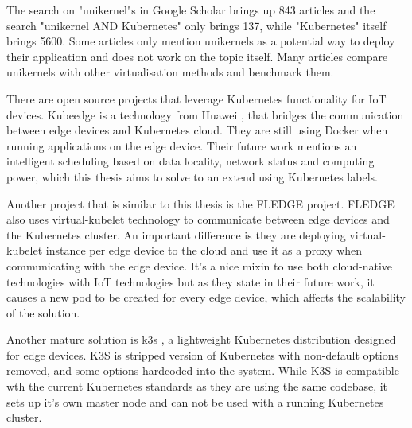  The search on "unikernel"s in Google Scholar brings up 843 articles and the search "unikernel AND Kubernetes" only brings 137, while "Kubernetes" itself brings 5600. Some articles only mention unikernels as a potential way to deploy their application and does not work on the topic itself. Many articles compare unikernels with other virtualisation methods and benchmark them.

There are open source projects that leverage Kubernetes functionality for IoT devices. Kubeedge \cite{kubeedge} is a technology from Huawei , that bridges the communication between edge devices and Kubernetes cloud. They are still using Docker when running applications on the edge device. Their future work mentions an intelligent scheduling based on data locality, network status and computing power, which this thesis aims to solve to an extend using Kubernetes labels.

Another project that is similar to this thesis is the FLEDGE project\cite{fledge}. FLEDGE also uses virtual-kubelet technology to communicate between edge devices and the Kubernetes cluster. An important difference is they are deploying virtual-kubelet instance per edge device to the cloud and use it as a proxy when communicating with the edge device. It's a nice mixin to use both cloud-native technologies with IoT technologies but as they state in their future work, it causes a new pod to be created for every edge device, which affects the scalability of the solution.

Another mature solution is k3s \cite{k3s}, a lightweight Kubernetes distribution designed for edge devices. K3S is stripped version of Kubernetes with non-default options removed, and some options hardcoded into the system. While K3S is compatible wth the current Kubernetes standards as they are using the same codebase, it sets up it's own master node and can not be used with a running Kubernetes cluster.



\fi